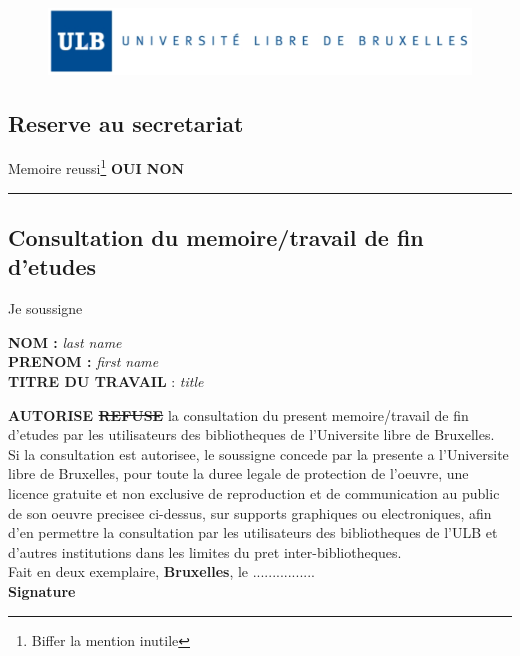 \begin{figure}
    \centering
    \includegraphics[width=\linewidth]{images/ulb.png}
\end{figure}

\subsection*{Reserve au secretariat}

Memoire reussi\footnote{Biffer la mention inutile} \textbf{OUI NON}\\

\vspace{0.5cm}

\hrule

\vspace{0.5cm}

\subsection*{Consultation du memoire/travail de fin d'etudes}


\noindent Je soussigne\\

\begin{minipage}[b]{0.05\linewidth} 
\end{minipage}\hfill
\begin{minipage}[b]{0.95\linewidth}   
\textbf{NOM :} \textit{last name}\\
\textbf{PRENOM :} \textit{first name}\\
\textbf{TITRE DU TRAVAIL} : \textit{title}\\
\end{minipage}



\noindent\textbf{AUTORISE \sout{REFUSE}} la consultation du present memoire/travail de fin d'etudes par les utilisateurs des bibliotheques de l'Universite libre de Bruxelles.\\

Si la consultation est autorisee, le soussigne concede par la presente a l'Universite libre de Bruxelles, pour toute la duree legale de protection de l'oeuvre, une licence gratuite et non exclusive de reproduction et de communication au public de son oeuvre precisee ci-dessus, sur supports graphiques ou electroniques, afin d'en permettre la consultation par les utilisateurs des bibliotheques de l'ULB et d'autres institutions dans les limites du pret inter-bibliotheques.\\

Fait en deux exemplaire, \textbf{Bruxelles}, le ................\\
\textbf{Signature}
